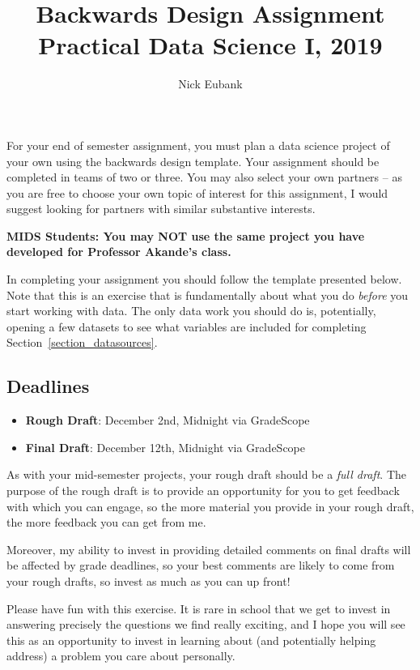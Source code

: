 \documentclass[12pt]{article}
\title{Backwards Design Assignment \\ Practical Data Science I, 2019}
\author{Nick Eubank}
\begin{document}
\maketitle

For your end of semester assignment, you must plan a data science project of your own using the backwards design template. Your assignment should be completed in teams of two or three. You may also select your own partners -- as you are free to choose your own topic of interest for this assignment, I would suggest looking for partners with similar substantive interests.

\textbf{MIDS Students: You may NOT use the same project you have developed for Professor Akande's class.}

In completing your assignment you should follow the template presented below. Note that this is an exercise that is fundamentally about what you do \emph{before} you start working with data. The only data work you should do is, potentially, opening a few datasets to see what variables are included for completing Section~\ref{section_datasources}.

\subsection*{Deadlines}

\begin{itemize}
  \item \textbf{Rough Draft}: December 2nd, Midnight via GradeScope
  \item \textbf{Final Draft}: December 12th, Midnight via GradeScope
\end{itemize}

As with your mid-semester projects, your rough draft should be a \emph{full draft}. The purpose of the rough draft is to provide an opportunity for you to get feedback with which you can engage, so the more material you provide in your rough draft, the more feedback you can get from me.

Moreover, my ability to invest in providing detailed comments on final drafts will be affected by grade deadlines, so your best comments are likely to come from your rough drafts, so invest as much as you can up front!

Please have fun with this exercise. It is rare in school that we get to invest in answering precisely the questions we find really exciting, and I hope you will see this as an opportunity to invest in learning about (and potentially helping address) a problem you care about personally.
\end{document}
